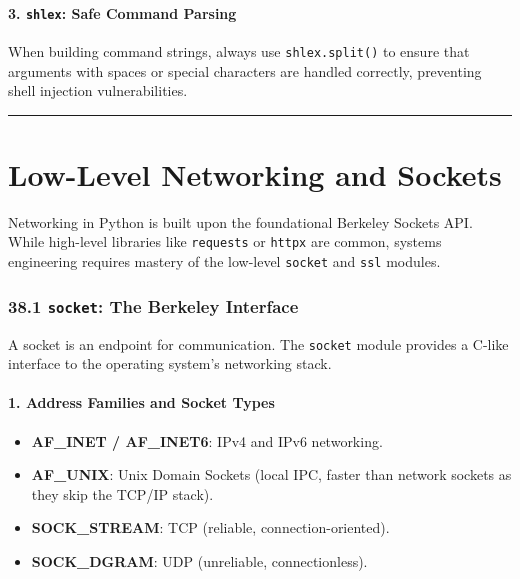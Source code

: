 \hypertarget{shlex-safe-command-parsing}{%
\subsubsection{\texorpdfstring{3. \texttt{shlex}: Safe Command
Parsing}{3. shlex: Safe Command Parsing}}\label{shlex-safe-command-parsing}}

When building command strings, always use
\passthrough{\lstinline!shlex.split()!} to ensure that arguments with
spaces or special characters are handled correctly, preventing shell
injection vulnerabilities.

\begin{center}\rule{0.5\linewidth}{0.5pt}\end{center}

\hypertarget{low-level-networking-and-sockets}{%
\chapter{Low-Level Networking and
Sockets}\label{low-level-networking-and-sockets}}

Networking in Python is built upon the foundational Berkeley Sockets
API. While high-level libraries like \passthrough{\lstinline!requests!}
or \passthrough{\lstinline!httpx!} are common, systems engineering
requires mastery of the low-level \passthrough{\lstinline!socket!} and
\passthrough{\lstinline!ssl!} modules.

\hypertarget{socket-the-berkeley-interface}{%
\subsection{\texorpdfstring{38.1 \texttt{socket}: The Berkeley
Interface}{38.1 socket: The Berkeley Interface}}\label{socket-the-berkeley-interface}}

A socket is an endpoint for communication. The
\passthrough{\lstinline!socket!} module provides a C-like interface to
the operating system's networking stack.

\hypertarget{address-families-and-socket-types}{%
\subsubsection{1. Address Families and Socket
Types}\label{address-families-and-socket-types}}

\begin{itemize}
\tightlist
\item
  \textbf{AF\_INET / AF\_INET6}: IPv4 and IPv6 networking.
\item
  \textbf{AF\_UNIX}: Unix Domain Sockets (local IPC, faster than network
  sockets as they skip the TCP/IP stack).
\item
  \textbf{SOCK\_STREAM}: TCP (reliable, connection-oriented).
\item
  \textbf{SOCK\_DGRAM}: UDP (unreliable, connectionless).
\end{itemize}

